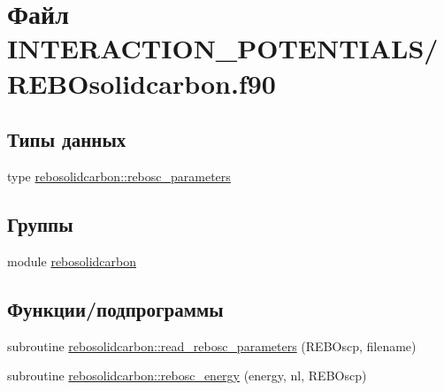 \hypertarget{_r_e_b_osolidcarbon_8f90}{}\section{Файл I\+N\+T\+E\+R\+A\+C\+T\+I\+O\+N\+\_\+\+P\+O\+T\+E\+N\+T\+I\+A\+L\+S/\+R\+E\+B\+Osolidcarbon.f90}
\label{_r_e_b_osolidcarbon_8f90}
\subsection*{Типы данных}
\begin{DoxyCompactItemize}
\item 
type \mbox{\hyperlink{structrebosolidcarbon_1_1rebosc__parameters}{rebosolidcarbon\+::rebosc\+\_\+parameters}}
\end{DoxyCompactItemize}
\subsection*{Группы}
\begin{DoxyCompactItemize}
\item 
module \mbox{\hyperlink{namespacerebosolidcarbon}{rebosolidcarbon}}
\end{DoxyCompactItemize}
\subsection*{Функции/подпрограммы}
\begin{DoxyCompactItemize}
\item 
subroutine \mbox{\hyperlink{namespacerebosolidcarbon_ac08d3d8f908fa0578d4565b200e96df0}{rebosolidcarbon\+::read\+\_\+rebosc\+\_\+parameters}} (R\+E\+B\+Oscp, filename)
\item 
subroutine \mbox{\hyperlink{namespacerebosolidcarbon_a300f2042f4b21284cfa42c0e4de3f0a8}{rebosolidcarbon\+::rebosc\+\_\+energy}} (energy, nl, R\+E\+B\+Oscp)
\end{DoxyCompactItemize}
